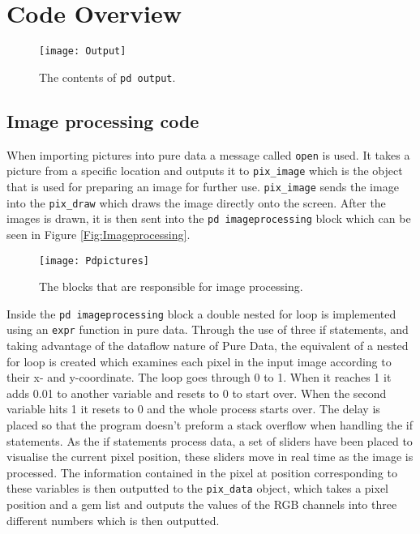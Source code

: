 \chapter{Code Overview}\label{ch:codeoverview}


\begin{figure}
\centering
\texttt{[image: Output]}
\caption{The contents of \texttt{pd output}.}
\label{Fig:Output}
\end{figure}

\section{Image processing code}
When importing pictures into pure data a message called \texttt{open} is used. It takes a picture from a specific location and outputs it to \texttt{pix\_image} which is the object that is used for preparing an image for further use. \texttt{pix\_image} sends the image into the \texttt{pix\_draw} which draws the image directly onto the screen. After the images is drawn, it is then sent into the \texttt{pd imageprocessing} block which can be seen in Figure \ref{Fig:Imageprocessing}.

\begin{figure}
\centering
\texttt{[image: Pdpictures]}
\caption{The blocks that are responsible for image processing.}
\label{Fig:pdpicture}
\end{figure}

Inside the \texttt{pd imageprocessing} block a double nested for loop is implemented using an \texttt{expr} function in pure data. Through the use of three if statements, and taking advantage of the dataflow nature of Pure Data, the equivalent of a nested for loop is created which examines each pixel in the input image according to their x- and y-coordinate. The loop goes through 0 to 1. When it reaches 1 it adds 0.01 to another variable and resets to 0 to start over. When the second variable hits 1 it resets to 0 and the whole process starts over. The delay is placed so that the program doesn't preform a stack overflow when handling the if statements. 
As the if statements process data, a set of sliders have been placed to visualise the current pixel position, these sliders move in real time as the image is processed. The information contained in the pixel at position corresponding to these variables is then outputted to the \texttt{pix\_data} object, which takes a pixel position and a gem list and outputs the values of the RGB channels into three different numbers which is then outputted. 


